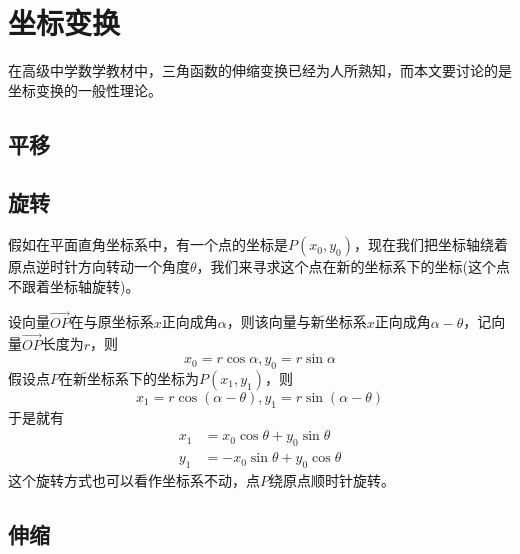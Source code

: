 
\section{坐标变换}
\label{sec:codinatie-axias-rotation}

在高级中学数学教材中，三角函数的伸缩变换已经为人所熟知，而本文要讨论的是坐标变换的一般性理论。

\subsection{平移}

\subsection{旋转}
假如在平面直角坐标系中，有一个点的坐标是$P(x_0,y_0)$，现在我们把坐标轴绕着原点逆时针方向转动一个角度$\theta$，我们来寻求这个点在新的坐标系下的坐标(这个点不跟着坐标轴旋转)。

设向量$\overrightarrow{OP}$在与原坐标系$x$正向成角$\alpha$，则该向量与新坐标系$x$正向成角$\alpha-\theta$，记向量$\overrightarrow{OP}$长度为$r$，则
\begin{equation*}
  x_0=r\cos{\alpha},y_0=r\sin{\alpha}
\end{equation*}
假设点$P$在新坐标系下的坐标为$P(x_1,y_1)$，则
\begin{equation*}
  x_1=r\cos{(\alpha-\theta)},y_1=r\sin{(\alpha-\theta)}
\end{equation*}
于是就有
\begin{equation}
  \label{eq:formulas-rotation-axias}
  \begin{split}
  x_1 & = x_0\cos{\theta} + y_0\sin{\theta} \\
  y_1 & = -x_0\sin{\theta} + y_0\cos{\theta}
  \end{split}
\end{equation}
这个旋转方式也可以看作坐标系不动，点$P$绕原点顺时针旋转。

\subsection{伸缩}


